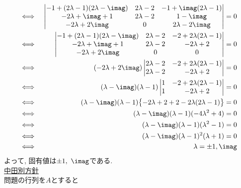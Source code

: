 \documentclass[dvipdfmx,titlepage, 11pt, a4paper]{jsarticle}%
\begin{document}
\begin{enumerate}[(1)]
\begin{eqnarray*}
        \Longleftrightarrow\ && 
        \begin{vmatrix}
            -1 + (2\lambda - 1)(2\lambda - \imag) & 2\lambda - 2 & -1 + \imag(2\lambda - 1)\\
            -2\lambda + \imag + 1 & 2\lambda - 2 & 1 - \imag\\
            -2\lambda + 2\imag & 0 & 2\lambda - 2\imag
        \end{vmatrix} = 0\\
        \Longleftrightarrow\ && 
        \begin{vmatrix}
            -1 + (2\lambda - 1)(2\lambda - \imag) & 2\lambda - 2 & -2 + 2\lambda(2\lambda - 1)\\
            -2\lambda + \imag + 1 & 2\lambda - 2 & -2\lambda + 2\\
            -2\lambda + 2\imag & 0 & 0
        \end{vmatrix} = 0\\
        \Longleftrightarrow\ && (-2\lambda + 2\imag)
        \begin{vmatrix}
            2\lambda - 2 & -2 + 2\lambda(2\lambda - 1)\\
            2\lambda - 2& -2\lambda + 2
        \end{vmatrix} = 0\\
        \Longleftrightarrow\ && (\lambda - \imag)(\lambda - 1)
        \begin{vmatrix}
            1 & -2 + 2\lambda(2\lambda - 1)\\
            1 & -2\lambda + 2
        \end{vmatrix} = 0\\
        \Longleftrightarrow\ && (\lambda - \imag)(\lambda - 1)\bigl\{-2\lambda + 2 + 2 - 2\lambda(2\lambda - 1)\bigr\} = 0\\
        \Longleftrightarrow\ && (\lambda - \imag)(\lambda - 1)(-4\lambda^{2} + 4) = 0\\
        \Longleftrightarrow\ && (\lambda - \imag)(\lambda - 1)(\lambda^{2} - 1) = 0\\
        \Longleftrightarrow\ && (\lambda - \imag)(\lambda - 1)^{2}(\lambda + 1) = 0\\
        \Longleftrightarrow\ && \lambda = \pm 1,\imag
    \end{eqnarray*}
    よって, 固有値は$\pm 1,\ \imag$である.\\
    \underline{中田別方針}\\
    問題の行列を$A$とすると
    \begin{eqnarray*}

\end{eqnarray*}
\end{enumerate}
\end{document}
